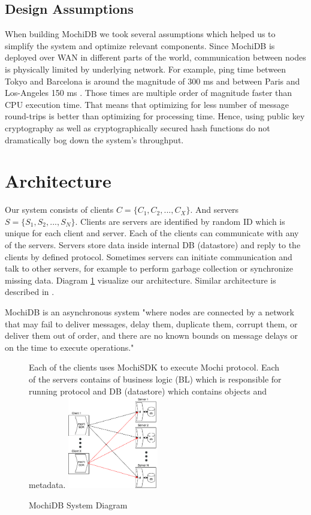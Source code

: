 \documentclass[letterpaper,twocolumn,10pt]{article}
\begin{document}
\subsection{Design Assumptions}
When building MochiDB we took several assumptions which helped us to simplify the system and optimize relevant components. Since MochiDB is deployed over WAN in different parts of the world, communication between nodes is physically limited by underlying network. For example, ping time between Tokyo and Barcelona is around the magnitude of 300 ms and between Paris and Los-Angeles 150 ms \cite{PingLatencies}. Those times are multiple order of magnitude faster than CPU execution time. That means that optimizing for less number of message round-trips is better than optimizing for processing time. Hence, using public key cryptography as well as cryptographically secured hash functions do not dramatically bog down the system's throughput. 

\section{Architecture}

Our system consists of clients \( C = \{ C_{1},C_{2}, ..., C_{X} \} \). And servers \( S = \{ S_{1}, S_{2}, ..., S_{N} \} \). Clients are servers are identified by random ID which is unique for each client and server. Each of the clients can communicate with any of the servers. Servers store data inside internal DB (datastore) and reply to the clients by defined protocol. Sometimes servers can initiate communication and talk to other servers, for example to perform garbage collection or synchronize missing data.  Diagram \ref{fig:system_view} visualize our architecture. Similar architecture is described in \cite{HQ_replication}.

MochiDB is an asynchronous system "where nodes are connected by a network that may fail to deliver messages, delay them, duplicate them, corrupt them, or
deliver them out of order, and there are no known bounds on message delays or on the time to execute operations." \cite{HQ_replication}

\begin{figure}
\caption{MochiDB System Diagram}
\small
Each of the clients uses MochiSDK to execute Mochi protocol. Each of the servers contains of business logic (BL) which is responsible for running protocol and DB (datastore) which contains objects and metadata.
\centering
\includegraphics[width=0.35\textwidth]{System_View.png}
\label{fig:system_view}
\end{figure}
\end{document}
